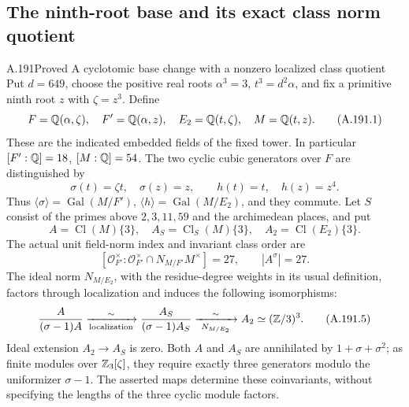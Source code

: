 \subsection{The ninth-root base and its exact class norm quotient}

\begin{statement}{A.191}{Proved}
{A cyclotomic base change with a nonzero localized class quotient}
Put \(d=649\), choose the positive real roots
\(\alpha^3=3\), \(t^3=d^2\alpha\), and fix a primitive
ninth root \(z\) with \(\zeta=z^3\).  Define
\[
 F=\mathbb Q(\alpha,\zeta),\quad F'=\mathbb Q(\alpha,z),\quad
 E_2=\mathbb Q(t,\zeta),\quad M=\mathbb Q(t,z).
\tag{A.191.1}
\]
These are the indicated embedded fields of the fixed tower.
In particular \([F':\mathbb Q]=18\), \([M:\mathbb Q]=54\).  The two
cyclic cubic generators over \(F\) are distinguished by
\[
 \sigma(t)=\zeta t,\quad \sigma(z)=z,
 \qquad h(t)=t,\quad h(z)=z^4.
\tag{A.191.2}
\]
Thus \(\langle\sigma\rangle=\operatorname{Gal}(M/F')\),
\(\langle h\rangle=\operatorname{Gal}(M/E_2)\), and they commute.
Let \(S\) consist of the primes above \(2,3,11,59\) and
the archimedean places, and put
\[
 A=\operatorname{Cl}(M)\{3\},\quad
 A_S=\operatorname{Cl}_S(M)\{3\},\quad
 A_2=\operatorname{Cl}(E_2)\{3\}.
\tag{A.191.3}
\]
The actual unit field-norm index and invariant class order are
\[
 [\mathcal O_{F'}^\times:
    \mathcal O_{F'}^\times\cap N_{M/F'}M^\times]=27,
 \qquad |A^\sigma|=27.
\tag{A.191.4}
\]
The ideal norm \(N_{M/E_2}\), with the residue-degree weights
in its usual definition, factors through localization and induces
the following isomorphisms:
\[
 \frac{A}{(\sigma-1)A}
   \xrightarrow[\mathrm{localization}]{\ \sim\ }
 \frac{A_S}{(\sigma-1)A_S}
   \xrightarrow[\ N_{M/E_2}\ ]{\ \sim\ }
 A_2\simeq(\mathbb Z/3)^3.
\tag{A.191.5}
\]
Ideal extension \(A_2\to A_S\) is zero.
Both \(A\) and \(A_S\) are annihilated by
\(1+\sigma+\sigma^2\); as finite modules over
\(\mathbb Z_3[\zeta]\), they require exactly three generators modulo
the uniformizer \(\sigma-1\).  The asserted maps determine
these coinvariants, without specifying the lengths of the three
cyclic module factors.
\end{statement}

